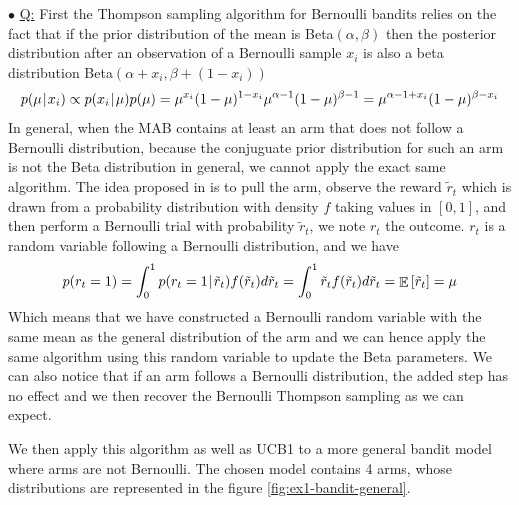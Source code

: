 \documentclass[a4paper, 11pt]{article}
\newcounter{cquestion}
\renewcommand{\thecquestion}{\arabic{cquestion}}
\newenvironment{question}
{\par \vspace{0.5em} \noindent \stepcounter{cquestion} \hspace{-1em}
 $\bullet$ \underline{Q\thecquestion :}}
{}
\newcommand{\pcond}[2]{p(#1 \hspace{-.2em}\mid\hspace{-.2em} #2)}
\newcommand{\e}[1]{\mathop{\mathbb{E}}\left[#1\right]}
\begin{document}
\begin{question}
  First the Thompson sampling algorithm for Bernoulli bandits relies
  on the fact that if the prior distribution of the mean is
  Beta$(\alpha, \beta)$ then the posterior distribution after an
  observation of a Bernoulli sample $x_i$ is also a beta distribution
  Beta$(\alpha + x_i, \beta + (1 - x_i))$
  \begin{equation*}
    \pcond{\mu}{x_i} \propto \pcond{x_i}{\mu} p(\mu) =
    \mu^{x_i} (1 - \mu)^{1 - x_i} \mu^{\alpha - 1} (1 -\mu)^{\beta - 1} = \mu^{\alpha - 1 + x_i} (1 -\mu)^{\beta - x_i}
  \end{equation*}
  In general, when the MAB contains at least an arm that does not
  follow a Bernoulli distribution, because the conjuguate prior
  distribution for such an arm is not the Beta distribution in
  general, we cannot apply the exact same algorithm. The idea
  proposed in \cite{agrawalgoyal12} is to pull the arm, observe the
  reward $\tilde{r}_t$ which is drawn from a probability distribution
  with density $f$ taking values in $[0, 1]$, and then perform a
  Bernoulli trial with probability $\tilde{r}_t$, we note $r_t$ the
  outcome. $r_t$ is a random variable following a Bernoulli
  distribution, and we have
  \begin{equation*}
    p(r_t = 1) = \int_{0}^1 \pcond{r_t = 1}{\tilde{r}_t} f(\tilde{r}_t) d\tilde{r}_t
    = \int_{0}^1 \tilde{r}_t f(\tilde{r}_t) d\tilde{r}_t
    = \e{\tilde{r}_t} = \mu
  \end{equation*}
  Which means that we have constructed a Bernoulli random variable
  with the same mean as the general distribution of the arm and we can
  hence apply the same algorithm using this random variable to update
  the Beta parameters. We can also notice that if an arm follows a
  Bernoulli distribution, the added step has no effect and we then
  recover the Bernoulli Thompson sampling as we can expect.


  We then apply this algorithm as well as UCB1 to a more general
  bandit model where arms are not Bernoulli. The chosen model contains
  4 arms, whose distributions are represented in the figure
  \ref{fig:ex1-bandit-general}.


\end{question}
\end{document}
